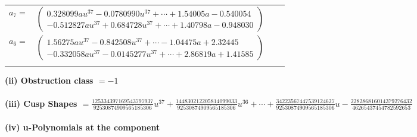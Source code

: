 \documentclass[1p]{elsarticle_modified}
\theoremstyle{definition}
\begin{document}
\begin{tabular}{m{7pt} m{180pt} m{7pt} m{180pt} }
\flushright $a_{7}=$&$\begin{pmatrix}0.328099 a u^{37}-0.0780990 u^{37}+\cdots+1.54005 a-0.540054\\-0.512827 a u^{37}+0.684728 u^{37}+\cdots+1.40798 a-0.948030\end{pmatrix}$ \\
\flushright $a_{6}=$&$\begin{pmatrix}1.56275 a u^{37}-0.842508 u^{37}+\cdots-1.04475 a+2.32445\\-0.332058 a u^{37}-0.0145277 u^{37}+\cdots+2.86819 a+1.41585\end{pmatrix}$\\&\end{tabular}
\flushleft \textbf{(ii) Obstruction class $= -1$}\\~\\
\flushleft \textbf{(iii) Cusp Shapes $= \frac{125334397169543797937}{92530874909565185306} u^{37}+\frac{144830212205814099033}{92530874909565185306} u^{36}+\cdots+\frac{34223567447539124627}{92530874909565185306} u-\frac{228286816014379276432}{46265437454782592653}$}\\~\\
\newpage\renewcommand{\arraystretch}{1}
\flushleft \textbf{(iv) u-Polynomials at the component}\newline \\
\end{document}
